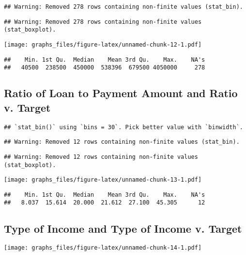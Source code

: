 \documentclass[]{article}
\begin{document}
\begin{verbatim}
## Warning: Removed 278 rows containing non-finite values (stat_bin).
\end{verbatim}

\begin{verbatim}
## Warning: Removed 278 rows containing non-finite values (stat_boxplot).
\end{verbatim}

\texttt{[image: graphs\_files/figure-latex/unnamed-chunk-12-1.pdf]}

\begin{verbatim}
##    Min. 1st Qu.  Median    Mean 3rd Qu.    Max.    NA's 
##   40500  238500  450000  538396  679500 4050000     278
\end{verbatim}

\subsection{Ratio of Loan to Payment Amount and Ratio v.
Target}\label{ratio-of-loan-to-payment-amount-and-ratio-v.-target}

\begin{verbatim}
## `stat_bin()` using `bins = 30`. Pick better value with `binwidth`.
\end{verbatim}

\begin{verbatim}
## Warning: Removed 12 rows containing non-finite values (stat_bin).
\end{verbatim}

\begin{verbatim}
## Warning: Removed 12 rows containing non-finite values (stat_boxplot).
\end{verbatim}

\texttt{[image: graphs\_files/figure-latex/unnamed-chunk-13-1.pdf]}

\begin{verbatim}
##    Min. 1st Qu.  Median    Mean 3rd Qu.    Max.    NA's 
##   8.037  15.614  20.000  21.612  27.100  45.305      12
\end{verbatim}

\subsection{Type of Income and Type of Income v.
Target}\label{type-of-income-and-type-of-income-v.-target}

\texttt{[image: graphs\_files/figure-latex/unnamed-chunk-14-1.pdf]}
\end{document}
